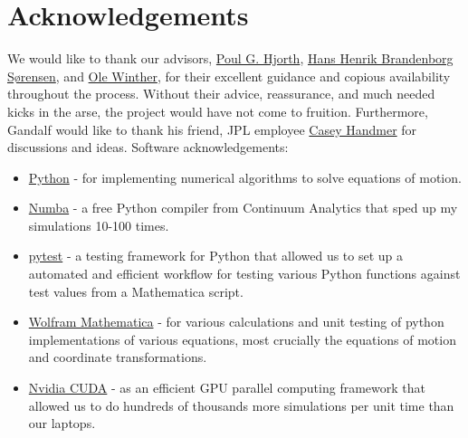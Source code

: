 \chapter{Acknowledgements}
We would like to thank our advisors, \href{http://www.dtu.dk/english/service/phonebook/person?id=901&tab=1}{Poul G. Hjorth}, \href{http://www.dtu.dk/english/service/phonebook/person?id=30220&tab=1}{Hans Henrik Brandenborg Sørensen}, and \href{http://www.dtu.dk/english/service/phonebook/person?id=10167&tab=1}{Ole Winther}, for their excellent guidance and copious availability throughout the process. Without their advice, reassurance, and much needed kicks in the arse, the project would have not come to fruition. Furthermore, Gandalf would like to thank his friend, JPL employee \href{https://www.linkedin.com/in/casey-handmer-60183262/}{Casey Handmer} for discussions and ideas.
\vspace{2cm}
Software acknowledgements:
\begin{itemize}
    \item \href{https://www.python.org}{Python} - for implementing numerical algorithms to solve equations of motion.
    \item \href{http://numba.pydata.org}{Numba} - a free Python compiler from Continuum Analytics that sped up my simulations 10-100 times.
    \item \href{https://docs.pytest.org/en/latest/}{pytest} - a testing framework for Python that allowed us to set up a automated and efficient workflow for testing various Python functions against test values from a Mathematica script.
    \item \href{http://www.wolfram.com/mathematica/}{Wolfram Mathematica} - for various calculations and unit testing of python implementations of various equations, most crucially the equations of motion and coordinate transformations.
    \item \href{https://developer.nvidia.com/cuda-zone}{Nvidia CUDA} - as an efficient GPU parallel computing framework that allowed us to do hundreds of thousands more simulations per unit time than our laptops.
\end{itemize}